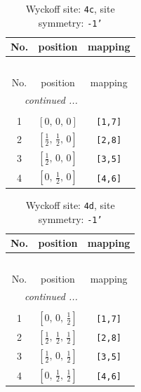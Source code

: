 \documentclass[fleqn,8pt]{jsarticle}
\begin{document}
\renewcommand{\arraystretch}{1.2}
\begin{longtable}{ccc}
\caption{Wyckoff site: {\tt 4c}, site symmetry: {\tt -1'}}
 \\
 \hline \hline
No. & position & mapping \\ \hline \endfirsthead

\multicolumn{2}{l}{\tablename\ \thetable{}} \\
 \hline \hline
No. & position & mapping \\ \hline \endhead

 \hline \hline
\multicolumn{2}{r}{\footnotesize\it continued ...} \\ \endfoot

 \hline \hline
\multicolumn{2}{r}{} \\ \endlastfoot

1 & $\left[ 0,\, 0,\, 0 \right]$ & {\tt [1,7]} \\ \hline
2 & $\left[ \frac{1}{2},\, \frac{1}{2},\, 0 \right]$ & {\tt [2,8]} \\ \hline
3 & $\left[ \frac{1}{2},\, 0,\, 0 \right]$ & {\tt [3,5]} \\ \hline
4 & $\left[ 0,\, \frac{1}{2},\, 0 \right]$ & {\tt [4,6]} \\
\end{longtable}
\renewcommand{\arraystretch}{1.2}
\begin{longtable}{ccc}
\caption{Wyckoff site: {\tt 4d}, site symmetry: {\tt -1'}}
 \\
 \hline \hline
No. & position & mapping \\ \hline \endfirsthead

\multicolumn{2}{l}{\tablename\ \thetable{}} \\
 \hline \hline
No. & position & mapping \\ \hline \endhead

 \hline \hline
\multicolumn{2}{r}{\footnotesize\it continued ...} \\ \endfoot

 \hline \hline
\multicolumn{2}{r}{} \\ \endlastfoot

1 & $\left[ 0,\, 0,\, \frac{1}{2} \right]$ & {\tt [1,7]} \\ \hline
2 & $\left[ \frac{1}{2},\, \frac{1}{2},\, \frac{1}{2} \right]$ & {\tt [2,8]} \\ \hline
3 & $\left[ \frac{1}{2},\, 0,\, \frac{1}{2} \right]$ & {\tt [3,5]} \\ \hline
4 & $\left[ 0,\, \frac{1}{2},\, \frac{1}{2} \right]$ & {\tt [4,6]} \\
\end{longtable}
\end{document}
